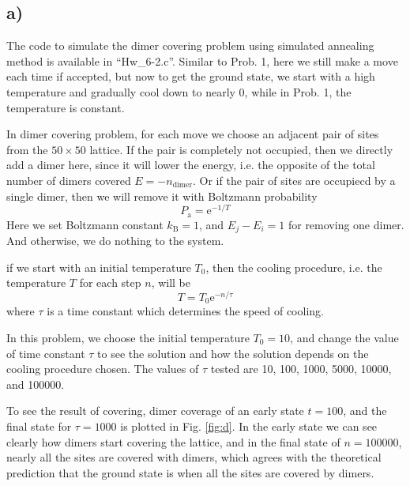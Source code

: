 \documentclass[12pt, graphicx]{article}
\begin{document}
\subsection*{a)}
The code to simulate the dimer covering problem using simulated annealing method is available in \textquotedblleft Hw\_6-2.c\textquotedblright. Similar to Prob. 1, here we still make a move each time if accepted, but now to get the ground state, we start with a high temperature and gradually cool down to nearly 0, while in Prob. 1, the temperature is constant. \par
In dimer covering problem, for each move we choose an adjacent pair of sites from the $50\times50$ lattice. If the pair is completely not occupied, then we directly add a dimer here, since it will lower the energy, i.e. the opposite of the total number of dimers covered $E=-n_\mathrm{dimer}$. Or if the pair of sites are occupiecd by a single dimer, then we will remove it with Boltzmann probability
\begin{equation}
P_\mathrm{a}=\mathrm{e}^{-1/T}
\label{eq:pacc}
\end{equation}
Here we set Boltzmann constant $k_\mathrm{B}=1$, and $E_j-E_i=1$ for removing one dimer. And otherwise, we do nothing to the system.\par
if we start with an initial temperature $T_0$, then the cooling procedure, i.e. the temperature $T$ for each step $n$, will be
\begin{equation}
T=T_0\mathrm{e}^{-n/\tau}
\label{eq:T}
\end{equation}
where $\tau$ is a time constant which determines the speed of cooling.\par
In this problem, we choose the initial temperature $T_0=10$, and change the value of time constant $\tau$ to see the solution and how the solution depends on the cooling procedure chosen. The values of $\tau$ tested are 10, 100, 1000, 5000, 10000, and 100000.\par
To see the result of covering, dimer coverage of an early state $t=100$, and the final state for $\tau=1000$ is plotted in Fig. \ref{fig:d}. In the early state we can see clearly how dimers start covering the lattice, and in the final state of $n=100000$, nearly all the sites are covered with dimers, which agrees with the theoretical prediction that the ground state is when all the sites are covered by dimers.\par
\end{document}
